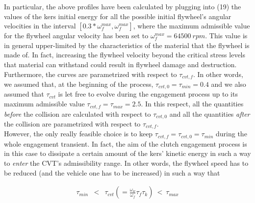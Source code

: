 \documentclass[11pt]{article}
\begin{document}
In particular, the above profiles have been calculated by plugging into (19) the values of the kers initial energy for all the possible initial flywheel's angular velocities in the interval $[0.3*\omega_f^{max}, \omega_f^{max}]$, where the maximum admissible value for the flywheel angular velocity has been set to $\omega_f^{max}=64500\ rpm$. This value is in general upper-limited by the characteristics of the material that the flywheel is made of. In fact, increasing the flywheel velocity beyond the critical stress levels that material can withstand could result in flywheel damage and destruction.\\ Furthermore, the curves are parametrized with respect to $\tau_{cvt,f}$. In other words, we assumed that, at the beginning of the process, $\tau_{cvt,0} = \tau_{min} = 0.4$ and we also assumed that $\tau_{cvt}$ is let free to evolve during the engagement process up to its maximum admissible value $\tau_{cvt,f} = \tau_{max} = 2.5$. In this respect, all the quantities \textit{before} the collision are calculated with respect to $\tau_{cvt,0}$ and all the quantities \textit{after} the collision are parametrized with respect to $\tau_{cvt,f}$.\\ However, the only really feasible choice is to keep $\tau_{cvt,f} = \tau_{cvt,0} = \tau_{min}$ during the whole engagement transient. In fact, the aim of the clutch engagement process is in this case to dissipate a certain amount of the kers' kinetic energy in such a way to \textit{enter} the CVT's admissibility range. In other words, the flywheel speed has to be reduced (and the vehicle one has to be increased) in such a way that 

\begin{eqnarray}
\tau_{min}&<& \tau_{cvt} \left(= \frac{\omega_w}{\omega_f}\tau_f \tau_k\right)\ <\ \tau_{max}
\end{eqnarray}
          
\end{document}

